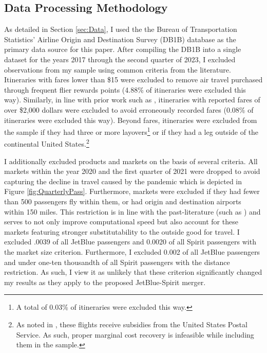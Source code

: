 \documentclass{article}
\begin{document}
\FloatBarrier
\pagebreak
\begin{appendices}
    
\setcounter{table}{0}
\setcounter{figure}{0}
\renewcommand{\thetable}{\Alph{section}\arabic{table}}
\renewcommand{\thefigure}{\Alph{section}\arabic{figure}}

	\section{Data Processing Methodology}
	\label{sec:DataProcessing}
	As detailed in Section \ref{sec:Data},	I used the the Bureau of Transportation Statistics' Airline Origin and Destination Survey (DB1B) database as the primary data source for this paper. After compiling the DB1B into a single dataset for the years 2017 through the second quarter of 2023, I excluded observations from my sample using common criteria from the literature. Itineraries with fares lower than \$15 were excluded to remove air travel purchased through frequent flier rewards points (4.88\% of itineraries were excluded this way). Similarly, in line with prior work such as \citet{berry_tracing_2010}, itineraries with reported fares of over \$2,000 dollars were excluded to avoid erroneously recorded fares (0.08\% of itineraries were excluded this way). Beyond fares, itineraries were excluded from the sample if they had three or more layovers\footnote{A total of 0.03\% of itineraries were excluded this way.} or if they had a leg outside of the continental United States.\footnote{As noted in \citet{ciliberto_market_2021}, these flights receive subsidies from the United States Postal Service. As such, proper marginal cost recovery is infeasible while including them in the sample.} 
	
	I additionally excluded products and markets on the basis of several criteria. All markets within the year 2020 and the first quarter of 2021 were dropped to avoid capturing the decline in travel caused by the pandemic which is depicted in Figure \ref{fig:QuarterlyPass}. Furthermore, markets were excluded if they had fewer than 500 passengers fly within them, or had origin and destination airports within 150 miles. This restriction is in line with the past-literature (such as \citet{ciliberto_does_2014}) and serves to not only improve computational speed but also account for these markets featuring stronger substitutability to the outside good for travel. I excluded .0039 of all JetBlue passengers and 0.0020 of all Spirit passengers with the market size criterion. Furthermore, I excluded 0.002 of all JetBlue passengers and under one-ten thousandth of all Spirit passengers with the distance restriction. As such, I view it as unlikely that these criterion significantly changed my results as they apply to the proposed JetBlue-Spirit merger.
    

\end{appendices}
\end{document}
